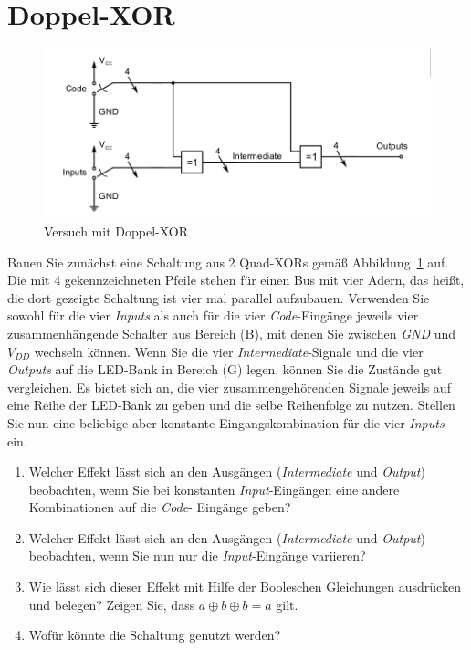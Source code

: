 \documentclass[10pt]{scrreprt}
\begin{document}
    \section{Doppel-XOR}
    \begin{figure}[H]
        \includegraphics[width=\textwidth]{abb14.png}
        \caption{Versuch mit Doppel-XOR}
        \label{fig:abb14}
    \end{figure}
    Bauen Sie zunächst eine Schaltung aus 2 Quad-XORs gemäß Abbildung~\ref{fig:abb14} auf. Die
    mit 4 gekennzeichneten Pfeile stehen für einen Bus mit vier Adern, das heißt, die dort
    gezeigte Schaltung ist vier mal parallel aufzubauen. Verwenden Sie sowohl für die vier
    \textit{Inputs} als auch für die vier \textit{Code}-Eingänge jeweils vier zusammenhängende Schalter aus
    Bereich (B), mit denen Sie zwischen \textit{GND} und $V_{DD}$ wechseln können. Wenn Sie die vier
    \textit{Intermediate}-Signale und die vier \textit{Outputs} auf die LED-Bank in Bereich (G) legen, können
    Sie die Zustände gut vergleichen. Es bietet sich an, die vier zusammengehörenden Signale
    jeweils auf eine Reihe der LED-Bank zu geben und die selbe Reihenfolge zu nutzen.
    Stellen Sie nun eine beliebige aber konstante Eingangskombination für die vier \textit{Inputs}
    ein.
    \begin{enumerate}
        \item Welcher Effekt lässt sich an den Ausgängen (\textit{Intermediate} und \textit{Output}) beobachten,
            wenn Sie bei konstanten \textit{Input}-Eingängen eine andere Kombinationen auf die \textit{Code}-
            Eingänge geben?
        \item Welcher Effekt lässt sich an den Ausgängen (\textit{Intermediate} und \textit{Output}) beobachten,
            wenn Sie nun nur die \textit{Input}-Eingänge variieren?
        \item Wie lässt sich dieser Effekt mit Hilfe der Booleschen Gleichungen ausdrücken und
            belegen? Zeigen Sie, dass $a \oplus b \oplus b = a$ gilt.
        \item Wofür könnte die Schaltung genutzt werden?
    \end{enumerate}
\end{document}
